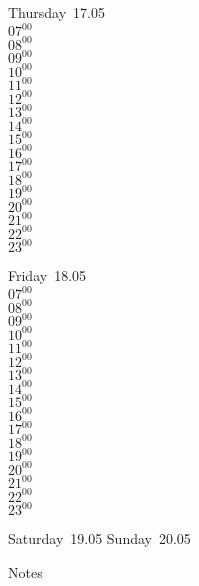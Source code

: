 \documentclass[11pt, a4paper]{book}\usepackage[]{graphicx}\usepackage[]{color}
\begin{document}
\begin{weekdaybox}
  Thursday~17.05\\
  { 
  \vfill
  $07^{00}$\\
$08^{00}$\\
$09^{00}$\\
$10^{00}$\\
$11^{00}$\\
$12^{00}$\\
$13^{00}$\\
$14^{00}$\\
$15^{00}$\\
$16^{00}$\\
$17^{00}$\\
$18^{00}$\\
$19^{00}$\\
$20^{00}$\\
$21^{00}$\\
$22^{00}$\\
$23^{00}$\\
  }
\end{weekdaybox} 
\begin{weekdaybox}
  Friday~18.05\\
  { 
  \vfill
  $07^{00}$\\
$08^{00}$\\
$09^{00}$\\
$10^{00}$\\
$11^{00}$\\
$12^{00}$\\
$13^{00}$\\
$14^{00}$\\
$15^{00}$\\
$16^{00}$\\
$17^{00}$\\
$18^{00}$\\
$19^{00}$\\
$20^{00}$\\
$21^{00}$\\
$22^{00}$\\
$23^{00}$\\
  }
\end{weekdaybox}
\begin{weekendbox}
  Saturday~19.05
  \tcblower
  Sunday~20.05
\end{weekendbox} %
\begin{notebox}
  Notes
\end{notebox}
\clearpage
\end{document}

